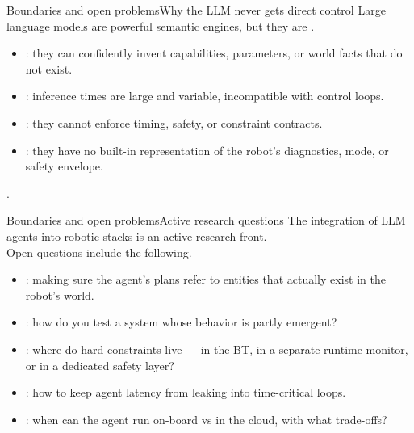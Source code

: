 \begin{frame}{Boundaries and open problems}{Why the LLM never gets direct control}
  \justifying
  Large language models are powerful semantic engines, but they are .
  \begin{itemize}
    \item {}: they can confidently invent capabilities, parameters, or world facts that do not exist.
    \item {}: inference times are large and variable, incompatible with control loops.
    \item {}: they cannot enforce timing, safety, or constraint contracts.
    \item {}: they have no built-in representation of the robot's diagnostics, mode, or safety envelope.
  \end{itemize}
  \bigskip
  \begin{alertblock}{}
    \centering
    .
  \end{alertblock}
\end{frame}
\begin{frame}{Boundaries and open problems}{Active research questions}
  \justifying
  The integration of LLM agents into robotic stacks is an active research front.\\
  Open questions include the following.
  \begin{itemize}
    \item {}: making sure the agent's plans refer to entities that actually exist in the robot's world.
    \item {}: how do you test a system whose behavior is partly emergent?
    \item {}: where do hard constraints live --- in the BT, in a separate runtime monitor, or in a dedicated safety layer?
    \item {}: how to keep agent latency from leaking into time-critical loops.
    \item {}: when can the agent run on-board vs in the cloud, with what trade-offs?
  \end{itemize}
\end{frame}

